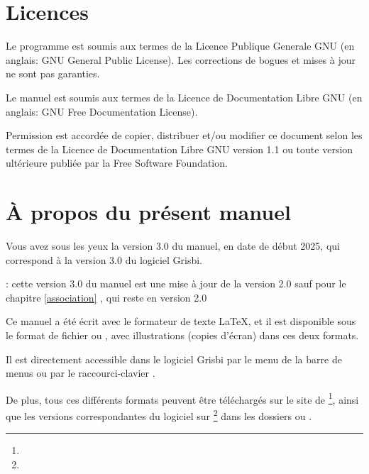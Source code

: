 \section{Licences\label{introduction-licenses}}


Le programme est soumis aux termes de la \gls{Licence Publique Generale GNU} (en anglais: \gls{GNU General Public License}). Les corrections de bogues et mises à jour ne sont pas garanties.

Le manuel est soumis aux termes de la \gls{Licence de Documentation Libre GNU} (en anglais: \gls{GNU Free Documentation License}).

Permission est accordée de copier, distribuer et/ou modifier ce document selon les termes de la Licence de Documentation Libre GNU version 1.1 ou toute version ultérieure publiée par la \gls{Free Software Foundation}.


\section{À propos du présent manuel\label{introduction-manual}}


Vous avez sous les yeux la version \actuality{}3.0 du manuel, en date de \actuality{}début 2025, qui correspond à la version 3.0 du logiciel Grisbi.


\Note{}: cette version 3.0 du manuel est une mise à jour de la version 2.0 sauf pour le chapitre \vref{association} , qui reste en version 2.0 %


Ce manuel a été écrit avec le \gls{formateur de texte} \gls{LaTeX}, et il est disponible sous le \gls{format de fichier}  ou , avec illustrations (copies d'écran) dans ces deux formats. 

Il est directement accessible dans le logiciel Grisbi par le menu  de la barre de menus ou par le raccourci-clavier .

De plus, tous ces différents formats peuvent être téléchargés sur le site de \footnote{\urlSourceForgeDocumentation{}}, ainsi que les versions correspondantes du logiciel sur \footnote{\urlSourceForge{}} dans les dossiers  ou .

